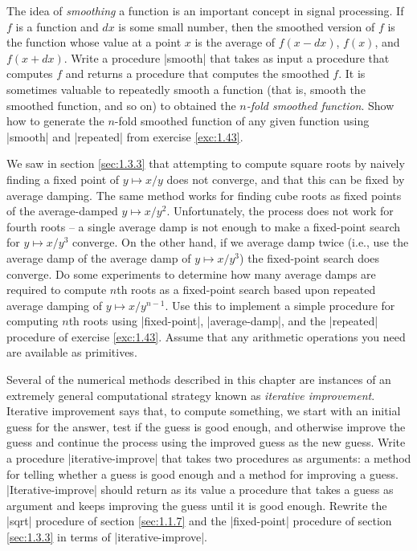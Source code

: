 \begin{Exercise}
\label{exc:1.44}
The idea of \textit{smoothing} a function is an important concept in
signal processing.  If $f$ is a function and $dx$ is some small
number, then the smoothed version of $f$ is the function whose value
at a point $x$ is the average of $f(x - dx)$, $f(x)$, and $f(x + dx)$.
Write a procedure \scheme|smooth| that takes as input a procedure that
computes $f$ and returns a procedure that computes the smoothed $f$.
It is sometimes valuable to repeatedly smooth a function (that is,
smooth the smoothed function, and so on) to obtained the
\textit{$n$-fold smoothed function}.  Show how to generate the
$n$-fold smoothed function of any given function using \scheme|smooth|
and \scheme|repeated| from exercise \ref{exc:1.43}.
\end{Exercise}

\begin{Exercise}
\label{exc:1.45}
We saw in section \ref{sec:1.3.3} that attempting to compute square
roots by naively finding a fixed point of $y \mapsto x/y$ does not
converge, and that this can be fixed by average damping.  The same
method works for finding cube roots as fixed points of the
average-damped $y \mapsto x/y^2$.  Unfortunately, the process does not
work for fourth roots -- a single average damp is not enough to make a
fixed-point search for $y \mapsto x/y^3$ converge.  On the other hand,
if we average damp twice (i.e., use the average damp of the average
damp of $y \mapsto x/y^3$) the fixed-point search does converge.  Do
some experiments to determine how many average damps are required to
compute $n$th roots as a fixed-point search based upon repeated
average damping of $y \mapsto x/y^{n-1}$.  Use this to implement a
simple procedure for computing $n$th roots using \scheme|fixed-point|,
\scheme|average-damp|, and the \scheme|repeated| procedure of exercise
\ref{exc:1.43}.  Assume that any arithmetic operations you need are
available as primitives.
\end{Exercise}


\begin{Exercise}
\label{exc:1.46}
Several of the numerical methods described in this chapter are
instances of an extremely general computational strategy known as
\textit{iterative improvement}.  Iterative improvement says that, to
compute something, we start with an initial guess for the answer, test
if the guess is good enough, and otherwise improve the guess and
continue the process using the improved guess as the new guess.  Write
a procedure \scheme|iterative-improve| that takes two procedures as
arguments: a method for telling whether a guess is good enough and a
method for improving a guess.  \scheme|Iterative-improve| should
return as its value a procedure that takes a guess as argument and
keeps improving the guess until it is good enough.  Rewrite the
\scheme|sqrt| procedure of section \ref{sec:1.1.7} and the
\scheme|fixed-point| procedure of section \ref{sec:1.3.3} in terms of
\scheme|iterative-improve|.
\end{Exercise}
